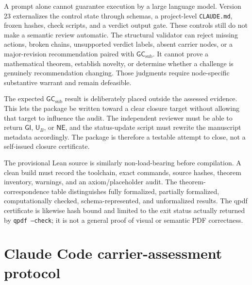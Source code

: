 \documentclass[10pt]{article}
\newcommand{\GI}{\mathsf{GI}}
\newcommand{\UB}{\mathsf{U}_B}
\newcommand{\NE}{\mathsf{NE}}
\newcommand{\GCsub}{\mathsf{GC}_{\mathrm{sub}}}
\begin{document}
A prompt alone cannot guarantee execution by a large language model.  Version 23 externalizes the control state through schemas, a project-level \texttt{CLAUDE.md}, frozen hashes, check scripts, and a verdict output gate.  These controls still do not make a semantic review automatic.  The structural validator can reject missing actions, broken chains, unsupported verdict labels, absent carrier nodes, or a major-revision recommendation paired with $\GCsub$.  It cannot prove a mathematical theorem, establish novelty, or determine whether a challenge is genuinely recommendation changing.  Those judgments require node-specific substantive warrant and remain defeasible.

The expected $\GCsub$ result is deliberately placed outside the assessed evidence.  This lets the package be written toward a clear closure target without allowing that target to influence the audit.  The independent reviewer must be able to return $\GI$, $\UB$, or $\NE$, and the status-update script must rewrite the manuscript metadata accordingly.  The package is therefore a testable attempt to close, not a self-issued closure certificate.

The provisional Lean source is similarly non-load-bearing before compilation.  A clean build must record the toolchain, exact commands, source hashes, theorem inventory, warnings, and an axiom/placeholder audit.  The theorem-correspondence table distinguishes fully formalized, partially formalized, computationally checked, schema-represented, and unformalized results.  The qpdf certificate is likewise hash bound and limited to the exit status actually returned by \texttt{qpdf --check}; it is not a general proof of visual or semantic PDF correctness.

\section{Claude Code carrier-assessment protocol}
\end{document}
